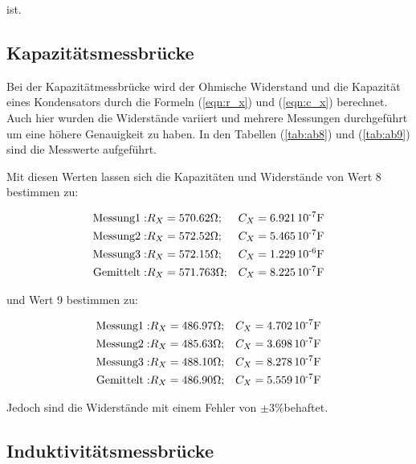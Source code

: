 ist.

\subsection{Kapazitätsmessbrücke}

Bei der Kapazitätmessbrücke wird der Ohmische Widerstand und die Kapazität eines Kondensators durch die Formeln (\ref{eqn:r_x}) und (\ref{eqn:c_x}) berechnet. Auch hier wurden die 
Widerstände variiert und mehrere Messungen durchgeführt um eine höhere Genauigkeit zu haben.
In den Tabellen (\ref{tab:ab8}) und (\ref{tab:ab9}) sind die Messwerte aufgeführt.

Mit diesen Werten lassen sich die Kapazitäten und Widerstände von Wert 8 bestimmen zu:

\begin{align*}
\text{Messung}1:& R_X = 570.62 \si{\ohm};  & C_X =  6.921\,  10\textsuperscript{-7}  \si{\farad}\\
\text{Messung}2:& R_X = 572.52 \si{\ohm};  & C_X = 5.465 \, 10\textsuperscript{-7}  \si{\farad}\\
\text{Messung}3:& R_X = 572.15 \si{\ohm};  & C_X = 1.229 \, 10\textsuperscript{-6}  \si{\farad}\\
\text{Gemittelt}:& R_X = 571.763 \si{\ohm};& C_X = 8.225 \, 10\textsuperscript{-7}  \si{\farad}\\
\end{align*}

und Wert 9 bestimmen zu:

\begin{align*}
\text{Messung}1:&  R_X = 486.97 \si{\ohm};& C_X =  4.702 \,  10\textsuperscript{-7}   \si{\farad}\\
\text{Messung}2:&  R_X = 485.63 \si{\ohm};& C_X = 3.698  \, 10\textsuperscript{-7}   \si{\farad}\\
\text{Messung}3:&  R_X = 488.10 \si{\ohm};& C_X = 8.278  \, 10\textsuperscript{-7}   \si{\farad}\\
\text{Gemittelt}:& R_X= 486.90 \si{\ohm};& C_X = 5.559 \,  10\textsuperscript{-7}   \si{\farad}\\
\end{align*}

Jedoch sind die Widerstände mit einem Fehler von $\pm 3\% $behaftet.

\subsection{Induktivitätsmessbrücke}

